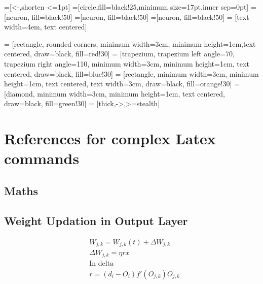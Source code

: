 \documentclass[12pt, right open]{memoir}
\begin{document}


=[<-,shorten <=1pt]
=[circle,fill=black!25,minimum size=17pt,inner sep=0pt]
=[neuron, fill=black!50]
=[neuron, fill=black!50]
=[neuron, fill=black!50]
 = [text width=4em, text centered]

 = [rectangle, rounded corners, minimum width=3cm, minimum height=1cm,text centered, draw=black, fill=red!30]
 = [trapezium, trapezium left angle=70, trapezium right angle=110, minimum width=3cm, minimum height=1cm, text centered, draw=black, fill=blue!30]
 = [rectangle, minimum width=3cm, minimum height=1cm, text centered, text width=3cm, draw=black, fill=orange!30]
 = [diamond, minimum width=3cm, minimum height=1cm, text centered, draw=black, fill=green!30]
 = [thick,->,>=stealth]


\chapter{References for complex Latex commands}

\section{Maths}
\section{Weight Updation in Output Layer}
\begin{align*}
&W_{j,k} = W_{j,k}(t) + \Delta W_{j,k} \\
&\Delta W_{j,k} = \eta r x \\
&\text{In delta} \\
&r = (d_i - O_i) f' (O_{j,k})O_{j,k}
\end{align*}

\end{document}
